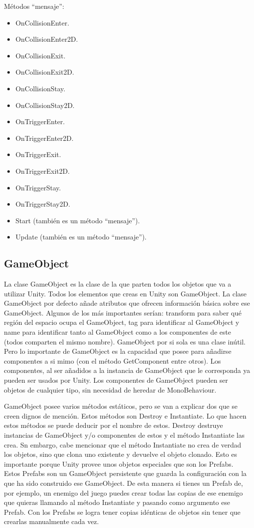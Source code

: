 Métodos “mensaje”:
\begin{itemize}
\item
OnCollisionEnter.
\item
OnCollisionEnter2D.
\item
OnCollisionExit.
\item
OnCollisionExit2D.
\item
OnCollisionStay.
\item
OnCollisionStay2D.
\item
OnTriggerEnter.
\item
OnTriggerEnter2D.
\item
OnTriggerExit.
\item
OnTriggerExit2D.
\item
OnTriggerStay.
\item
OnTriggerStay2D.
\item
Start (también es un método “mensaje”).
\item
Update (también es un método “mensaje”).
\end{itemize}

\subsection{GameObject}
La clase GameObject es la clase de la que parten todos los objetos que va a utilizar Unity. Todos los elementos que creas en Unity son GameObject. La clase GameObject por defecto añade atributos que ofrecen información básica sobre ese GameObject. Algunos de los más importantes serían: transform para saber qué región del espacio ocupa el GameObject, tag para identificar al GameObject y name para identificar tanto al GameObject como a los componentes de este (todos comparten el mismo nombre).
GameObject por si sola es una clase inútil. Pero lo importante de GameObject es la capacidad que posee para añadirse componentes a si mimo (con el método GetComponent entre otros). Los componentes, al ser añadidos a la instancia de GameObject que le corresponda ya pueden ser usados por Unity. Los componentes de GameObject pueden ser objetos de cualquier tipo, sin necesidad de heredar de MonoBehaviour.

GameObject posee varios métodos estáticos, pero se van a explicar dos que se creen dignos de mención. Estos métodos son Destroy e Instantiate. Lo que hacen estos métodos se puede deducir por el nombre de estos. Destroy destruye instancias de GameObject y/o componentes de estos y el método Instantiate las crea. Sn embargo, cabe mencionar que el método Instantiate no crea de verdad los objetos, sino que clona uno existente y devuelve el objeto clonado. Esto es importante porque Unity provee unos objetos especiales que son los Prefabs. Estos Prefabs son un GameObject persistente que guarda la configuración con la que ha sido construido ese GameObject. De esta manera si tienes un Prefab de, por ejemplo, un enemigo del juego puedes crear todas las copias de ese enemigo que quieras llamando al método Instantiate y pasando como argumento ese Prefab. Con los Prefabs se logra tener copias idénticas de objetos sin tener que crearlas manualmente cada vez.

